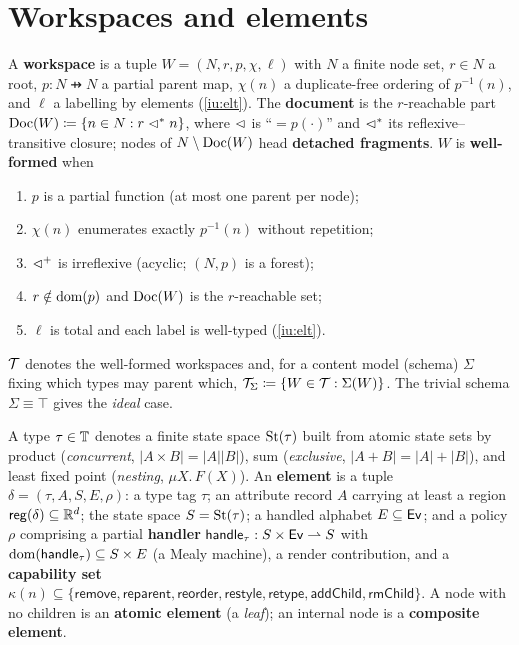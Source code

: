\documentclass[../uxoxo-main]{subfiles}
\begin{document}
\section{Workspaces and elements}\label{sec:workspaces}
\begin{definition}[Workspace]\label{def:workspace}
A \textbf{workspace} is a tuple $W=(N,r,p,\chi,\ell)$ with $N$ a finite node set,
$r\in N$ a root, $p:N\pfun N$ a partial parent map, $\chi(n)$ a duplicate-free
ordering of $p^{-1}(n)$, and $\ell$ a labelling by elements (\cref{iu:elt}).
The \textbf{document} is the $r$-reachable part
$\operatorname{Doc}(W)\coloneqq\{n\in N: r\vartriangleleft^{*} n\}$, where $\vartriangleleft$ is ``$=p(\cdot)$'' and
$\vartriangleleft^{*}$ its reflexive--transitive closure; nodes of $N\setminus\operatorname{Doc}(W)$ head
\textbf{detached fragments}. $W$ is \textbf{well-formed} when
\begin{enumerate}[label=\textbf{WF\arabic*.}, leftmargin=*, itemsep=1pt]
  \item $p$ is a partial function (at most one parent per node);
  \item $\chi(n)$ enumerates exactly $p^{-1}(n)$ without repetition;
  \item $\vartriangleleft^{+}$ is irreflexive (acyclic; $(N,p)$ is a forest);
  \item $r\notin\operatorname{dom}(p)$ and $\operatorname{Doc}(W)$ is the $r$-reachable set;
  \item $\ell$ is total and each label is well-typed (\cref{iu:elt}).
\end{enumerate}
$\mathcal{T}$ denotes the well-formed workspaces and, for a content model (schema)
$\Sigma$ fixing which types may parent which, $\mathcal{T}_\Sigma\coloneqq\{W\in\mathcal{T}:
\Sigma(W)\}$. The trivial schema $\Sigma\equiv\top$ gives the \emph{ideal} case.
\end{definition}

\begin{definition}[Element]\label{iu:elt}
A type $\tau\in\mathbb{T}$ denotes a finite state space $\mathrm{St}(\tau)$ built from atomic
state sets by product (\emph{concurrent}, $\lvert A\times B\rvert=\lvert A\rvert
\lvert B\rvert$), sum (\emph{exclusive}, $\lvert A+B\rvert=\lvert A\rvert+\lvert
B\rvert$), and least fixed point (\emph{nesting}, $\mu X.\,F(X)$). An
\textbf{element} is a tuple $\delta=(\tau,A,S,E,\rho)$: a type tag $\tau$; an
attribute record $A$ carrying at least a region $\mathsf{reg}(\delta)\subseteq\mathbb{R}^{d}$;
the state space $S=\mathrm{St}(\tau)$; a handled alphabet $E\subseteq\mathsf{Ev}$; and a policy
$\rho$ comprising a partial \textbf{handler}
$\mathsf{handle}_\tau:S\times\mathsf{Ev}\rightharpoonup S$ with $\operatorname{dom}(\mathsf{handle}_\tau)\subseteq S\times E$ (a
Mealy machine), a render contribution, and a \textbf{capability set}
$\kappa(n)\subseteq\{\mathsf{remove},\mathsf{reparent},\mathsf{reorder},
\mathsf{restyle},\mathsf{retype},\mathsf{addChild},\mathsf{rmChild}\}$. A node
with no children is an \textbf{atomic element} (a \emph{leaf}); an internal node
is a \textbf{composite element}.
\end{definition}
\end{document}
